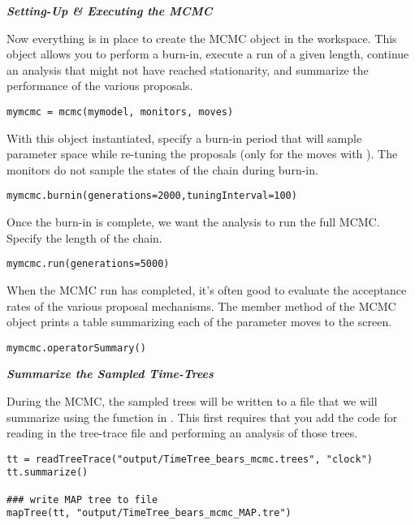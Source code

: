 \textbf{\textit{Setting-Up \& Executing the MCMC}}

Now everything is in place to create the MCMC object in the workspace.
This object allows you to perform a burn-in, execute a run of a given length, continue an analysis that might not have reached stationarity, and summarize the performance of the various proposals.
{\tt \begin{snugshade*}
\begin{lstlisting}
mymcmc = mcmc(mymodel, monitors, moves)
\end{lstlisting}
\end{snugshade*}}

With this object instantiated, specify a burn-in period that will sample parameter space while re-tuning the proposals (only for the moves with ). 
The monitors do not sample the states of the chain during burn-in.
{\tt \begin{snugshade*}
\begin{lstlisting}
mymcmc.burnin(generations=2000,tuningInterval=100)
\end{lstlisting}
\end{snugshade*}}

Once the burn-in is complete, we want the analysis to run the full MCMC. 
Specify the length of the chain. 
{\tt \begin{snugshade*}
\begin{lstlisting}
mymcmc.run(generations=5000)
\end{lstlisting}
\end{snugshade*}}

When the MCMC run has completed, it's often good to evaluate the acceptance rates of the various proposal mechanisms. 
The  member method of the MCMC object prints a table summarizing each of the parameter moves to the screen. 
{\tt \begin{snugshade*}
\begin{lstlisting}
mymcmc.operatorSummary()
\end{lstlisting}
\end{snugshade*}}

\textbf{\textit{Summarize the Sampled Time-Trees}}

During the MCMC, the sampled trees will be written to a file that we will summarize using the  function in \RevBayes.
This first requires that you add the code for reading in the tree-trace file and performing an analysis of those trees.
{\tt \begin{snugshade*}
\begin{lstlisting}
tt = readTreeTrace("output/TimeTree_bears_mcmc.trees", "clock")
tt.summarize()

### write MAP tree to file
mapTree(tt, "output/TimeTree_bears_mcmc_MAP.tre")
\end{lstlisting}
\end{snugshade*}}

